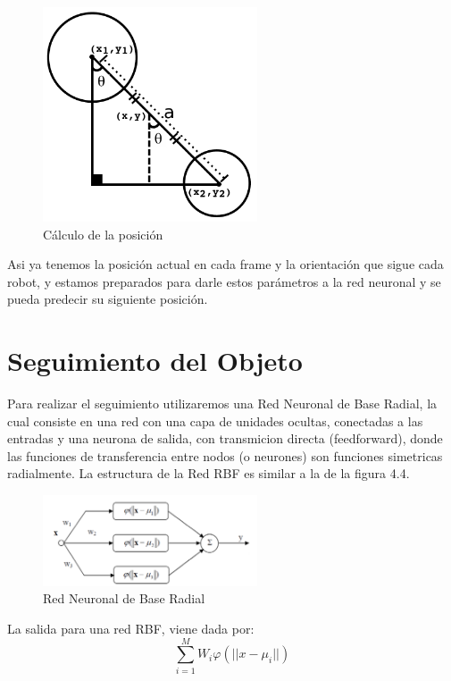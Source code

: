 \begin{figure}
\centering
\includegraphics[width=2.5in]{imagen2.pdf}
\caption{C\'alculo de la posici\'on}
\label{fig_cir}
\end{figure}
Asi ya tenemos la posici\'on actual en cada frame y la orientaci\'on que sigue cada robot, y estamos preparados para darle estos par\'ametros a la red neuronal  y se pueda predecir su siguiente posici\'on.


\section{Seguimiento del Objeto}
Para realizar el seguimiento utilizaremos una Red Neuronal de Base Radial, la cual consiste en una red con una  capa de unidades ocultas, conectadas a las entradas y una neurona de salida, con transmicion directa (feedforward), donde las funciones de transferencia entre nodos (o neurones) son funciones simetricas radialmente. La estructura de la Red RBF es similar a la de la figura 4.4.
\begin{figure}
\centering
\includegraphics[width=2.5in]{RBF.pdf}
\caption{Red Neuronal de Base Radial }
\label{fig_cir}
\end{figure}

La salida para una red RBF, viene dada por: 
\[
\sum_{i=1}^{M}W_{i}\varphi(||x-\mu_i||)
\]

